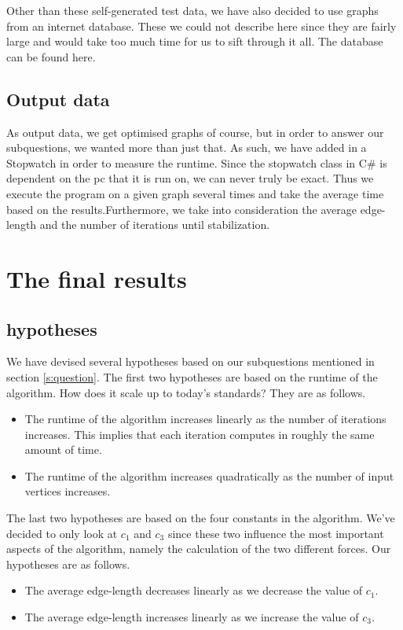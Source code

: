 \documentclass[a4paper,12pt,twoside]{article}
\begin{document}
Other than these self-generated test data, we have also decided to use graphs from an internet database. These we could not describe here since they are fairly large and would take too much time for us to sift through it all. The database can be found here\cite{Database}.
\subsection{Output data}
As output data, we get optimised graphs of course, but in order to answer our subquestions, we wanted more than just that. As such, we have added in a Stopwatch in order to measure the runtime. Since the stopwatch class in C\# is dependent on the pc that it is run on, we can never truly be exact. Thus we execute the program on a given graph several times and take the average time based on the results.Furthermore, we take into consideration the average edge-length and the number of iterations until stabilization.

\section{The final results}\label{s:results}

\subsection{hypotheses}
We have devised several hypotheses based on our subquestions mentioned in section \ref{s:question}. The first two hypotheses are based on the runtime of the algorithm. How does it scale up to today's standards? They are as follows.
\begin{itemize}
\item The runtime of the algorithm increases linearly as the number of iterations increases. This implies that each iteration computes in roughly the same amount of time.
\item The runtime of the algorithm increases quadratically as the number of input vertices increases.
\end{itemize}
The last two hypotheses are based on the four constants in the algorithm. We've decided to only look at $c_1$ and $c_3$ since these two influence the most important aspects of the algorithm, namely the calculation of the two different forces. Our hypotheses are as follows.
\begin{itemize}
\item The average edge-length decreases linearly as we decrease the value of $c_1$.
\item The average edge-length increases linearly as we increase the value of $c_3$.
\end{itemize}
\end{document}
